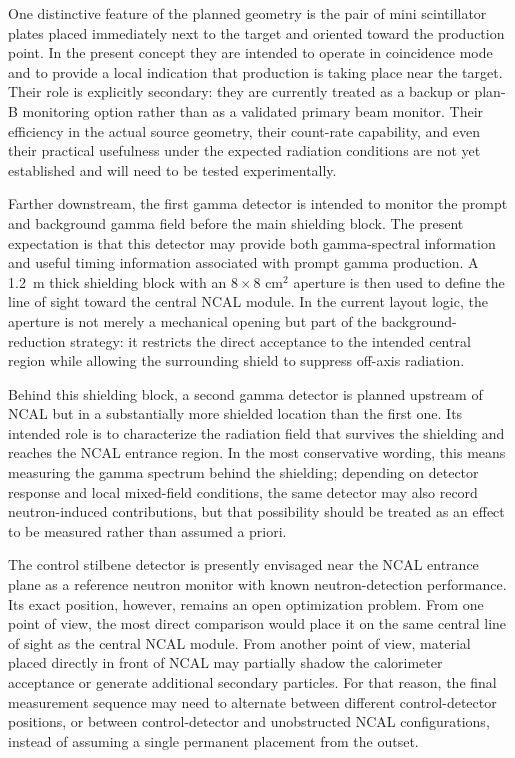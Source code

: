 One distinctive feature of the planned geometry is the pair of mini scintillator plates placed immediately next to the target and oriented toward the production point. In the present concept they are intended to operate in coincidence mode and to provide a local indication that production is taking place near the target. Their role is explicitly secondary: they are currently treated as a backup or plan-B monitoring option rather than as a validated primary beam monitor. Their efficiency in the actual source geometry, their count-rate capability, and even their practical usefulness under the expected radiation conditions are not yet established and will need to be tested experimentally.

Farther downstream, the first gamma detector is intended to monitor the prompt and background gamma field before the main shielding block. The present expectation is that this detector may provide both gamma-spectral information and useful timing information associated with prompt gamma production. A \SI{1.2}{m} thick shielding block with an $8 \times 8$ cm$^2$ aperture is then used to define the line of sight toward the central NCAL module. In the current layout logic, the aperture is not merely a mechanical opening but part of the background-reduction strategy: it restricts the direct acceptance to the intended central region while allowing the surrounding shield to suppress off-axis radiation.

Behind this shielding block, a second gamma detector is planned upstream of NCAL but in a substantially more shielded location than the first one. Its intended role is to characterize the radiation field that survives the shielding and reaches the NCAL entrance region. In the most conservative wording, this means measuring the gamma spectrum behind the shielding; depending on detector response and local mixed-field conditions, the same detector may also record neutron-induced contributions, but that possibility should be treated as an effect to be measured rather than assumed a priori.

The control stilbene detector is presently envisaged near the NCAL entrance plane as a reference neutron monitor with known neutron-detection performance. Its exact position, however, remains an open optimization problem. From one point of view, the most direct comparison would place it on the same central line of sight as the central NCAL module. From another point of view, material placed directly in front of NCAL may partially shadow the calorimeter acceptance or generate additional secondary particles. For that reason, the final measurement sequence may need to alternate between different control-detector positions, or between control-detector and unobstructed NCAL configurations, instead of assuming a single permanent placement from the outset.

